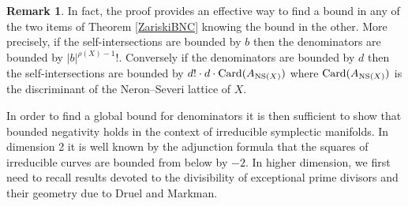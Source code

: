 \documentclass[12pt,reqno]{amsart}
\def\card{\mathop{\rm Card}\nolimits}
\theoremstyle{plain}
\theoremstyle{definition}
\newtheorem{remark}[thm]{Remark}
\begin{document}
\begin{remark} In fact, the proof provides an effective way to find a bound in any of the two items of Theorem \ref{ZariskiBNC} knowing the bound in the other. More precisely, if the self-intersections are bounded by $b$ then the denominators are bounded by $|b|^{\rho(X)-1}!$. Conversely if the denominators are bounded by $d$ then the self-intersections are bounded by $d!\cdot d \cdot \card(A_{{\rm NS}(X)})$ where $\card(A_{{\rm NS}(X)})$ is the discriminant of the Neron--Severi lattice of $X$.
\end{remark}

In order to find a global bound for denominators it is then sufficient to show that bounded negativity holds in the context of irreducible symplectic manifolds. In dimension 2 it is well known by the adjunction formula that the squares of irreducible curves are bounded from below by $-2$. In higher dimension, we first need to recall results devoted to the divisibility of exceptional prime divisors and their geometry due to Druel and Markman.
\end{document}
